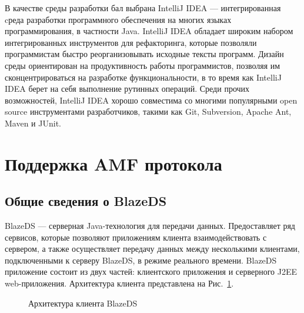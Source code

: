 В качестве среды разработки бал выбрана IntelliJ IDEA --- интегрированная cреда разработки программного обеспечения на
многих языках программирования, в частности Java. IntelliJ IDEA обладает широким набором интегрированных инструментов
для рефакторинга, которые позволяли программистам быстро реорганизовывать исходные тексты программ. Дизайн среды
ориентирован на продуктивность работы программистов, позволяя им сконцентрироваться на разработке функциональности,
в то время как IntelliJ IDEA берет на себя выполнение рутинных операций. Среди прочих возможностей, IntelliJ IDEA
хорошо совместима со многими популярными open source инструментами разработчиков, такими как Git, Subversion,
Apache Ant, Maven и JUnit\cite{idea-book}.

\section{Поддержка AMF протокола}

\subsection{Общие сведения о BlazeDS}

BlazeDS --- серверная Java-технология для передачи данных. Предоставляет ряд сервисов, которые позволяют приложениям
клиента взаимодействовать с сервером, а также осуществляет передачу данных между несколькими клиентами, подключенными
к серверу BlazeDS, в режиме реального времени. BlazeDS приложение состоит из двух частей: клиентского приложения и серверного
J2EE web-приложения. Архитектура клиента представлена на Рис.~\ref{ris:blazeDSClient.png}.

\begin{figure}[ht]
\caption{Архитектура клиента BlazeDS}
\label{ris:blazeDSClient.png}
\end{figure}

